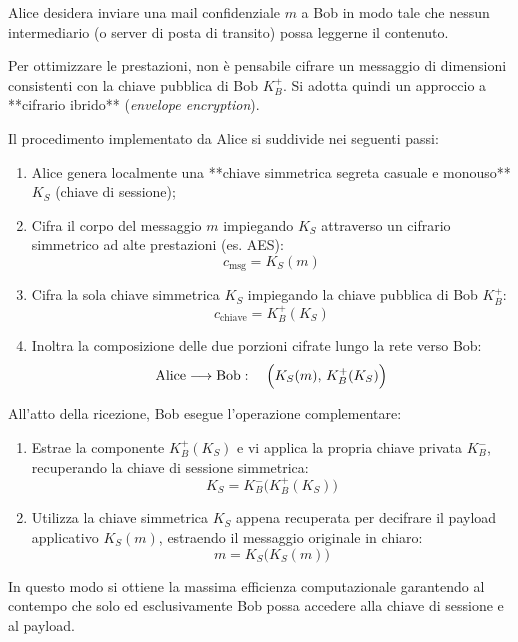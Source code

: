 \documentclass[11pt, a4paper]{article}
\begin{document}
Alice desidera inviare una mail confidenziale $m$ a Bob in modo tale che nessun intermediario (o server di posta di transito) possa leggerne il contenuto.

Per ottimizzare le prestazioni, non è pensabile cifrare un messaggio di dimensioni consistenti con la chiave pubblica di Bob $K_B^+$. Si adotta quindi un approccio a **cifrario ibrido** (\emph{envelope encryption}).


Il procedimento implementato da Alice si suddivide nei seguenti passi:
\begin{enumerate}[leftmargin=*]
    \item Alice genera localmente una **chiave simmetrica segreta casuale e monouso** $K_S$ (chiave di sessione);
    \item Cifra il corpo del messaggio $m$ impiegando $K_S$ attraverso un cifrario simmetrico ad alte prestazioni (es. AES):
    \[
    c_{\text{msg}} = K_S(m)
    \]
    \item Cifra la sola chiave simmetrica $K_S$ impiegando la chiave pubblica di Bob $K_B^+$:
    \[
    c_{\text{chiave}} = K_B^+(K_S)
    \]
    \item Inoltra la composizione delle due porzioni cifrate lungo la rete verso Bob:
    \[
    \text{Alice} \longrightarrow \text{Bob}: \quad \Bigl(K_S(m), \, K_B^+(K_S)\Bigr)
    \]
\end{enumerate}

All'atto della ricezione, Bob esegue l'operazione complementare:
\begin{enumerate}[leftmargin=*]
    \item Estrae la componente $K_B^+(K_S)$ e vi applica la propria chiave privata $K_B^-$, recuperando la chiave di sessione simmetrica:
    \[
    K_S = K_B^-\bigl(K_B^+(K_S)\bigr)
    \]
    \item Utilizza la chiave simmetrica $K_S$ appena recuperata per decifrare il payload applicativo $K_S(m)$, estraendo il messaggio originale in chiaro:
    \[
    m = K_S\bigl(K_S(m)\bigr)
    \]
\end{enumerate}
In questo modo si ottiene la massima efficienza computazionale garantendo al contempo che solo ed esclusivamente Bob possa accedere alla chiave di sessione e al payload.
\end{document}
